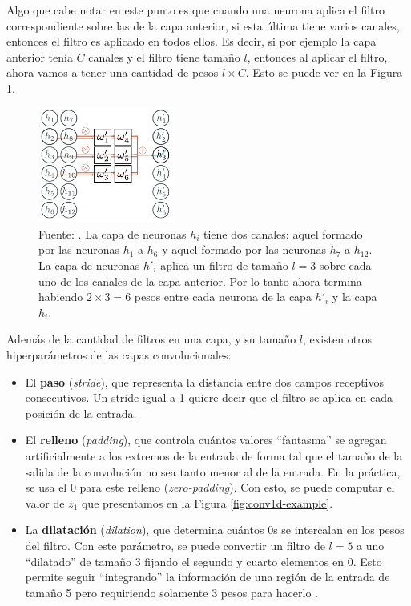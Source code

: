 \documentclass[../../main.tex]{subfiles}
\begin{document}
Algo que cabe notar en este punto es que cuando una neurona aplica el filtro
correspondiente sobre las de la capa anterior, si esta última tiene varios canales,
entonces el filtro es aplicado en todos ellos. Es decir, si por ejemplo la capa anterior
tenía \(C\) canales y el filtro tiene tamaño \(l\), entonces al aplicar el filtro, ahora
vamos a tener una cantidad de pesos \(l \times C\). Esto se puede ver en la Figura
\ref{fig:conv-layer-multi-channel}.

\begin{figure}
    \centering
    \includegraphics[width=0.4\textwidth]{figs/conv-layer-multi-channel.png}
    \caption{Fuente: \cite{prince2024understanding}. La capa de neuronas \(h_i\) tiene
    dos canales: aquel formado por las neuronas \(h_1\) a \(h_6\) y aquel formado
    por las neuronas \(h_7\) a \(h_{12}\). La capa de neuronas \(h'_i\) aplica un
    filtro de tamaño \(l=3\) sobre cada uno de los canales de la capa anterior. Por
    lo tanto ahora termina habiendo \(2 \times 3 = 6\) pesos entre cada neurona de la
    capa \(h'_i\) y la capa \(h_i\).}
    \label{fig:conv-layer-multi-channel}
\end{figure}

Además de la cantidad de filtros en una capa, y su tamaño \(l\), existen otros
hiperparámetros de las capas convolucionales: \vspace{-0.25cm}
\begin{itemize}[noitemsep]
    \item El \textbf{paso} (\textit{stride}), que representa la distancia entre dos campos receptivos
    consecutivos. Un stride igual a 1 quiere decir que el filtro se aplica en cada
    posición de la entrada.
    \item El \textbf{relleno} (\textit{padding}), que controla cuántos valores
    ``fantasma'' se agregan artificialmente a los extremos de la entrada de forma tal que
    el tamaño de la salida de la convolución no sea tanto menor al de la entrada. En la
    práctica, se usa el 0 para este relleno (\textit{zero-padding}). Con esto, se
    puede computar el valor de \(z_1\) que presentamos en la Figura \ref{fig:conv1d-example}.
    \item La \textbf{dilatación} (\textit{dilation}), que determina cuántos 0s se
    intercalan en los pesos del filtro. Con este parámetro, se puede convertir un filtro
    de \(l=5\) a uno ``dilatado'' de tamaño 3 fijando el segundo y cuarto elementos en 0.
    Esto permite seguir ``integrando'' la información de una región de la entrada de
    tamaño 5 pero requiriendo solamente 3 pesos para hacerlo
    \cite{prince2024understanding}.
\end{itemize}
\end{document}
